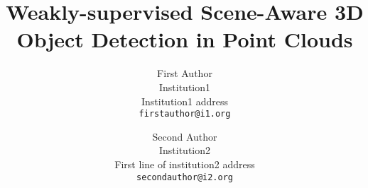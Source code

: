 \documentclass[10pt,twocolumn,letterpaper]{article}
\begin{document}
\title{Weakly-supervised Scene-Aware 3D Object Detection in Point Clouds}

\author{First Author\\
Institution1\\
Institution1 address\\
{\tt\small firstauthor@i1.org}
\and
Second Author\\
Institution2\\
First line of institution2 address\\
{\tt\small secondauthor@i2.org}
}

\maketitle
\end{document}
